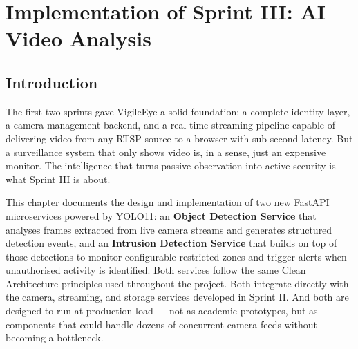 
\chapter{Implementation of Sprint III: AI Video Analysis}
\label{chap:sprint3}

\section{Introduction}
\label{sec:s3_intro}

\hspace{0.8cm}The first two sprints gave VigileEye a solid foundation: a complete identity layer, a camera management backend, and a real-time streaming pipeline capable of delivering video from any RTSP source to a browser with sub-second latency. But a surveillance system that only shows video is, in a sense, just an expensive monitor. The intelligence that turns passive observation into active security is what Sprint III is about.

\hspace{0.8cm}This chapter documents the design and implementation of two new FastAPI microservices powered by YOLO11: an \textbf{Object Detection Service} that analyses frames extracted from live camera streams and generates structured detection events, and an \textbf{Intrusion Detection Service} that builds on top of those detections to monitor configurable restricted zones and trigger alerts when unauthorised activity is identified. Both services follow the same Clean Architecture principles used throughout the project. Both integrate directly with the camera, streaming, and storage services developed in Sprint II. And both are designed to run at production load — not as academic prototypes, but as components that could handle dozens of concurrent camera feeds without becoming a bottleneck.

